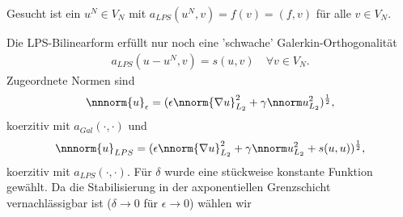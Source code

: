 Gesucht ist ein $u^{N} \in V_{N}$ mit $a_{LPS}(u^{N}, v) = f(v) = (f, v)$ für alle $v \in V_{N}$. 

Die LPS-Bilinearform erfüllt nur noch eine 'schwache' Galerkin-Orthogonalität
\begin{align*}
  a_{LPS}(u - u^{N}, v) = s(u, v) \quad \forall v \in V_{N}. 
\end{align*}
Zugeordnete Normen sind
\begin{align*}
  \nnnorm{u}_{\epsilon} = (\epsilon \nnorm{\nabla u}_{L_{2}}^{2} + \gamma \nnorm u_{L_{2}}^{2})^{\frac 12}, 
\end{align*}
koerzitiv mit $a_{Gal}(\cdot, \cdot)$ und 
\begin{align*}
    \nnnorm{u}_{LPS} = (\epsilon \nnorm{\nabla u}_{L_{2}}^{2} + \gamma \nnorm u_{L_{2}}^{2} + s(u, u))^{\frac 12}, 
\end{align*}
koerzitiv mit $a_{LPS}(\cdot, \cdot)$.
Für $\delta$ wurde 
eine stückweise konstante Funktion gewählt. 
Da die Stabilisierung in der axponentiellen Grenzschicht vernachlässigbar ist ($\delta \to 0$ für $\epsilon \to 0$) wählen wir




